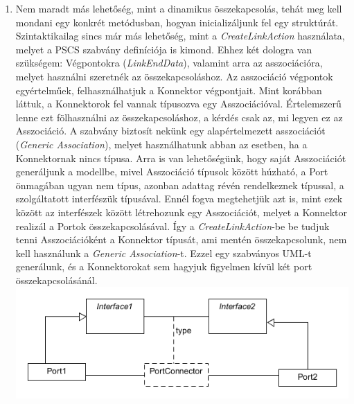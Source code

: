 \documentclass[a4paper,12pt]{report}
\begin{document}
\begin{enumerate}
\item Nem maradt más lehetőség, mint a dinamikus összekapcsolás, tehát meg kell mondani egy konkrét metódusban, hogyan inicializáljunk fel egy struktúrát. Szintaktikailag sincs már más lehetőség, mint a \textit{CreateLinkAction} használata, melyet a PSCS szabvány definíciója is kimond. Ehhez két dologra van szükségem: Végpontokra (\textit{LinkEndData}), valamint arra az asszociációra, melyet használni szeretnék az összekapcsoláshoz. Az asszociáció végpontok egyértelműek, felhasználhatjuk a Konnektor végpontjait. Mint korábban láttuk, a Konnektorok fel vannak típusozva egy Asszociációval. Értelemszerű lenne ezt fölhasználni az összekapcsoláshoz, a kérdés csak az, mi legyen ez az Asszociáció. A szabvány biztosít nekünk egy alapértelmezett asszociációt (\textit{Generic Association}), melyet használhatunk abban az esetben, ha a Konnektornak nincs típusa. Arra is van lehetőségünk, hogy saját Asszociációt generáljunk a modellbe, mivel Asszociáció típusok között húzható, a Port önmagában ugyan nem típus, azonban adattag révén rendelkeznek típussal, a szolgáltatott interfészük típusával. Ennél fogva megtehetjük azt is, mint ezek között az interfészek között létrehozunk egy Asszociációt, melyet a Konnektor realizál a Portok összekapcsolásával. Így a \textit{CreateLinkAction}-be be tudjuk tenni Asszociációként a Konnektor típusát, ami mentén összekapcsolunk, nem kell használunk a \textit{Generic Association}-t. Ezzel egy szabványos UML-t generálunk, és a Konnektorokat sem hagyjuk figyelmen kívül két port összekapcsolásánál. \\
\includegraphics[scale=0.8]{connect_type.png}
\end{enumerate}
\end{document}
